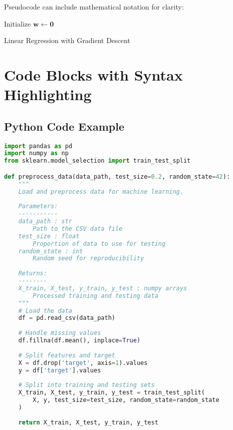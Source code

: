 \documentclass[a4paper,11pt]{article}
\begin{document}
Pseudocode can include mathematical notation for clarity:

\begin{algorithm}[H]
	\SetAlgoLined
	
	Initialize $\mathbf{w} \gets \mathbf{0}$\;
	\;
	\caption{Linear Regression with Gradient Descent}
\end{algorithm}

\section{Code Blocks with Syntax Highlighting}

\subsection{Python Code Example}

\begin{lstlisting}[language=Python, caption=Data Processing in Python, label=lst:python]
import pandas as pd
import numpy as np
from sklearn.model_selection import train_test_split

def preprocess_data(data_path, test_size=0.2, random_state=42):
    """
    Load and preprocess data for machine learning.
    
    Parameters:
    -----------
    data_path : str
        Path to the CSV data file
    test_size : float
        Proportion of data to use for testing
    random_state : int
        Random seed for reproducibility
        
    Returns:
    --------
    X_train, X_test, y_train, y_test : numpy arrays
        Processed training and testing data
    """
    # Load the data
    df = pd.read_csv(data_path)
    
    # Handle missing values
    df.fillna(df.mean(), inplace=True)
    
    # Split features and target
    X = df.drop('target', axis=1).values
    y = df['target'].values
    
    # Split into training and testing sets
    X_train, X_test, y_train, y_test = train_test_split(
        X, y, test_size=test_size, random_state=random_state
    )
    
    return X_train, X_test, y_train, y_test
\end{lstlisting}
\end{document}
